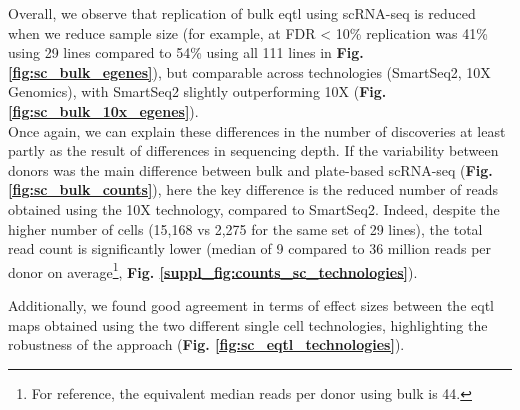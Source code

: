 Overall, we observe that replication of bulk \gls{eqtl} using scRNA-seq is reduced when we reduce sample size (for example, at FDR < 10\% replication was 41\% using 29 lines compared to 54\% using all 111 lines in \textbf{Fig. \ref{fig:sc_bulk_egenes}}), but comparable across technologies (SmartSeq2, 10X Genomics), with SmartSeq2 slightly outperforming 10X (\textbf{Fig. \ref{fig:sc_bulk_10x_egenes}}).
\\

Once again, we can explain these differences in the number of discoveries at least partly as the result of differences in sequencing depth.
If the variability between donors was the main difference between bulk and plate-based scRNA-seq (\textbf{Fig. \ref{fig:sc_bulk_counts}}), here the key difference is the reduced number of reads obtained using the 10X technology, compared to SmartSeq2.
Indeed, despite the higher number of cells (15,168 vs 2,275 for the same set of 29 lines), the total read count is significantly lower (median of 9 compared to 36 million reads per donor on average\footnote{For reference, the equivalent median reads per donor using bulk is 44.}, \textbf{Fig. \ref{suppl_fig:counts_sc_technologies}}).

\newpage

Additionally, we found good agreement in terms of effect sizes between the \gls{eqtl} maps obtained using the two different single cell technologies, highlighting the robustness of the approach (\textbf{Fig. \ref{fig:sc_eqtl_technologies}}). \\

